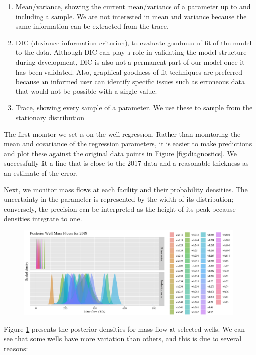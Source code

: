 \documentclass[a4paper, 12pt]{article}
\begin{document}
\begin{enumerate}
\item Mean/variance, showing the current mean/variance of a parameter up to and including a sample. We are not interested in mean and variance because the same information can be extracted from the trace.
\item DIC (deviance information criterion), to evaluate goodness of fit of the model to the data. Although DIC can play a role in validating the model structure during development, DIC is also not a permanent part of our model once it has been validated. Also, graphical goodness-of-fit techniques are preferred because an informed user can identify specific issues such as erroneous data that would not be possible with a single value.
\item Trace, showing every sample of a parameter. We use these to sample from the stationary distribution.
\end{enumerate}

The first monitor we set is on the well regression. Rather than monitoring the mean and covariance of the regression parameters, it is easier to make predictions and plot these against the original data points in Figure \ref{fig:diagnostics}. We successfully fit a line that is close to the 2017 data and a reasonable thickness as an estimate of the error.

Next, we monitor mass flows at each facility and their probability densities. The uncertainty in the parameter is represented by the width of its distribution; conversely, the precision can be interpreted as the height of its peak because densities integrate to one.

\begin{figure}
\centering
  \includegraphics[width=\linewidth]{media/mf_wells}
  \label{fig:mf_wells}
\end{figure}

Figure \ref{fig:mf_wells} presents the posterior densities for mass flow at selected wells. We can see that some wells have more variation than others, and this is due to several reasons:
\end{document}
